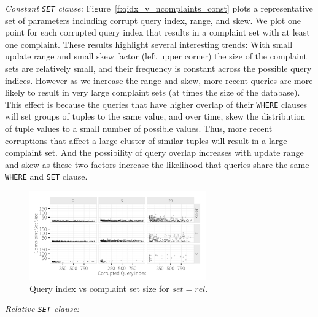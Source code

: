 \smallskip
\emph{Constant \texttt{SET} clause: } Figure~\ref{f:qidx_v_ncomplaints_const} plots a representative set of parameters including corrupt query index, range, and skew. We plot one point
for each corrupted query index that results in a complaint set with at least one complaint. 
These results highlight several interesting trends:  With small update range and small skew factor (left upper corner)
the size of the complaint sets are relatively small, and their frequency is constant across the possible query indices.
However as we increase the range and skew, more recent queries are more likely to result in very large complaint sets (at times the size of the database).   
This effect is because the queries that have higher overlap of their \texttt{WHERE} clauses will set groups of tuples to the same value,
and over time, skew the distribution of tuple values to a small number of possible values. 
Thus, more recent corruptions that affect a large cluster of similar tuples will result in a large complaint set.
And the possibility of query overlap increases with update range and skew as these two factors increase the likelihood that queries share the same \texttt{WHERE} and \texttt{SET} clause. 



\begin{figure}[t]
\centering
\includegraphics[width = 3in]{figures/qidxsimulation/qidx_v_ncomplaints_20attrs_rel}
\caption{Query index vs complaint set size for $set = rel$.}
\label{f:qidx_v_ncomplaints_rel} 
\end{figure}

\smallskip
\emph{Relative \texttt{SET} clause: } 

